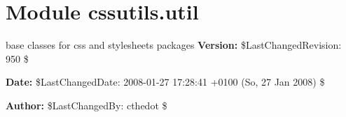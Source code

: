 %
%
%


\section{Module cssutils.util}

    \label{cssutils:util}

base classes for css and stylesheets packages
\textbf{Version:} \$LastChangedRevision: 950 \$



\textbf{Date:} \$LastChangedDate: 2008-01-27 17:28:41 +0100 (So, 27 Jan 2008) \$



\textbf{Author:} \$LastChangedBy: cthedot \$



